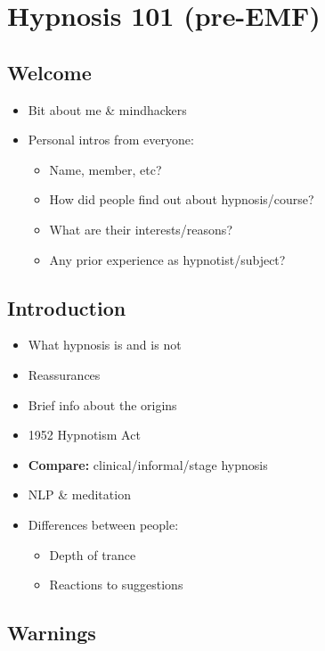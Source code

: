 \documentclass{dmistyle}
\begin{document}
\section{Hypnosis 101 (pre-EMF)}

\subsection{Welcome}

\begin{itemize}
	\item Bit about me \& mindhackers
	\item Personal intros from everyone:
		\begin{itemize}
			\item Name, member, etc?
			\item How did people find out about hypnosis/course?
			\item What are their interests/reasons?
			\item Any prior experience as hypnotist/subject?
		\end{itemize}
\end{itemize}

\subsection{Introduction}

\begin{multicols}{2}
\begin{itemize}
	\item What hypnosis is and is not
	\item Reassurances
	\item Brief info about the origins
	\item 1952 Hypnotism Act
	\item \textbf{Compare:} clinical/informal/stage hypnosis
	\item NLP \& meditation
	\item Differences between people:
		\begin{itemize}
			\item Depth of trance
			\item Reactions to suggestions
		\end{itemize}
\end{itemize}
\end{multicols}

\subsection{Warnings}
\end{document}
